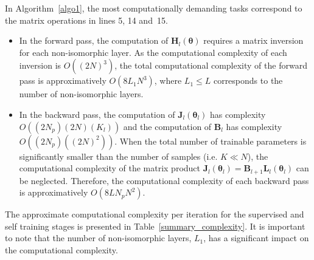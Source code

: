 \documentclass{article}
\begin{document}
In Algorithm~\ref{algo1}, the most computationally demanding tasks correspond to the matrix operations in lines 5, 14 and~15.
\begin{itemize}
\item In the forward pass, the computation of $\mathbf{H}_l(\boldsymbol \theta)$ requires a matrix inversion for each non-isomorphic layer. As the computational complexity of each inversion is $O((2N)^3)$, the total computational complexity of the forward pass is approximatively $O(8L_1N^3)$, where $L_1\le L$ corresponds to the number of non-isomorphic layers.
\item In the backward pass, the computation of $\mathbf{J}_l(\boldsymbol \theta_{l})$ has complexity $O((2N_p)(2N)(K_l))$ and the computation of $\mathbf{B}_l$ has complexity $O((2N_p)((2N)^2))$. When the total number of trainable parameters is significantly smaller than the number of samples (i.e. $K\ll N$), the computational complexity of the matrix product $\mathbf{J}_l(\boldsymbol \theta_{l})=\mathbf{B}_{l+1}\mathbf{L}_l(\boldsymbol \theta_{l})$ can be neglected. Therefore, the computational complexity of each backward pass is approximatively $O(8L N_p N^2)$.
\end{itemize}
The approximate computational complexity per iteration for the supervised and self training stages is presented in Table~\ref{summary_complexity}. It is important to note that the number of non-isomorphic layers, $L_1$,  has a significant impact on the computational complexity.
\end{document}
